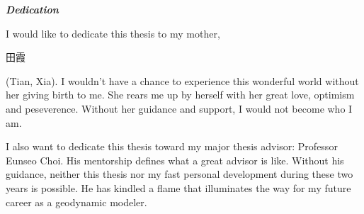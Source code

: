 \begin{center}
\textbf{\textit{Dedication}}
\end{center}

I would like to dedicate this thesis to my mother, \begin{CJK}{UTF8}{gbsn}田霞\end{CJK} (Tian, Xia). I wouldn't have a chance to experience this wonderful world without her giving birth to me. She rears me up by herself with her great love, optimism and peseverence. Without her guidance and support, I would not become who I am.

I also want to dedicate this thesis toward my major thesis advisor: Professor Eunseo Choi. His mentorship defines what a great advisor is like. Without his guidance, neither this thesis nor my fast personal development during these two years is possible. He has kindled a flame that illuminates the way for my future career as a geodynamic modeler.   

